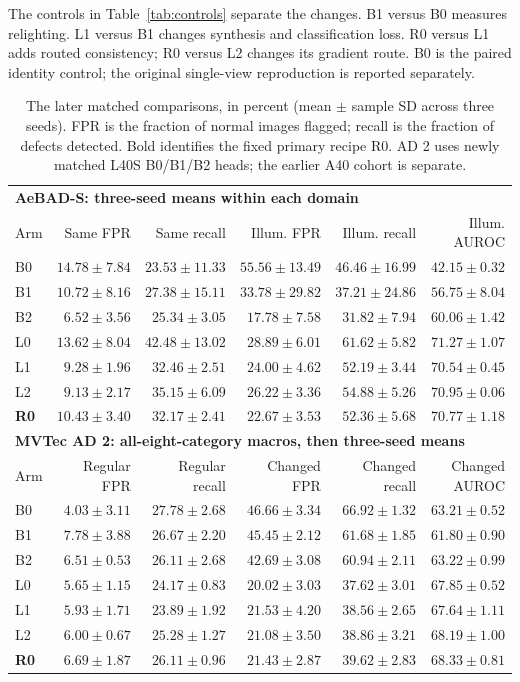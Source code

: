 \documentclass[letterpaper]{article}
\begin{document}
The controls in Table~\ref{tab:controls} separate the changes. B1 versus B0 measures
relighting. L1 versus B1 changes synthesis and classification loss. R0 versus L1 adds routed
consistency; R0 versus L2 changes its gradient route. B0 is the paired identity control; the
original single-view reproduction is reported separately.

\begin{table}[t]
\centering\small
\begin{tabular}{lrrrrr}
\toprule
\multicolumn{6}{l}{\textbf{AeBAD-S: three-seed means within each domain}}\\
Arm & Same FPR & Same recall & Illum. FPR & Illum. recall & Illum. AUROC\\
\midrule
B0 & $14.78\pm7.84$ & $23.53\pm11.33$ & $55.56\pm13.49$ & $46.46\pm16.99$ & $42.15\pm0.32$\\
B1 & $10.72\pm8.16$ & $27.38\pm15.11$ & $33.78\pm29.82$ & $37.21\pm24.86$ & $56.75\pm8.04$\\
B2 & $6.52\pm3.56$ & $25.34\pm3.05$ & $17.78\pm7.58$ & $31.82\pm7.94$ & $60.06\pm1.42$\\
L0 & $13.62\pm8.04$ & $42.48\pm13.02$ & $28.89\pm6.01$ & $61.62\pm5.82$ & $71.27\pm1.07$\\
L1 & $9.28\pm1.96$ & $32.46\pm2.51$ & $24.00\pm4.62$ & $52.19\pm3.44$ & $70.54\pm0.45$\\
L2 & $9.13\pm2.17$ & $35.15\pm6.09$ & $26.22\pm3.36$ & $54.88\pm5.26$ & $70.95\pm0.06$\\
\textbf{R0} & $10.43\pm3.40$ & $32.17\pm2.41$ & $22.67\pm3.53$ & $52.36\pm5.68$ & $70.77\pm1.18$\\
\midrule
\multicolumn{6}{l}{\textbf{MVTec AD 2: all-eight-category macros, then three-seed means}}\\
Arm & Regular FPR & Regular recall & Changed FPR & Changed recall & Changed AUROC\\
\midrule
B0 & $4.03\pm3.11$ & $27.78\pm2.68$ & $46.66\pm3.34$ & $66.92\pm1.32$ & $63.21\pm0.52$\\
B1 & $7.78\pm3.88$ & $26.67\pm2.20$ & $45.45\pm2.12$ & $61.68\pm1.85$ & $61.80\pm0.90$\\
B2 & $6.51\pm0.53$ & $26.11\pm2.68$ & $42.69\pm3.08$ & $60.94\pm2.11$ & $63.22\pm0.99$\\
L0 & $5.65\pm1.15$ & $24.17\pm0.83$ & $20.02\pm3.03$ & $37.62\pm3.01$ & $67.85\pm0.52$\\
L1 & $5.93\pm1.71$ & $23.89\pm1.92$ & $21.53\pm4.20$ & $38.56\pm2.65$ & $67.64\pm1.11$\\
L2 & $6.00\pm0.67$ & $25.28\pm1.27$ & $21.08\pm3.50$ & $38.86\pm3.21$ & $68.19\pm1.00$\\
\textbf{R0} & $6.69\pm1.87$ & $26.11\pm0.96$ & $21.43\pm2.87$ & $39.62\pm2.83$ & $68.33\pm0.81$\\
\bottomrule
\end{tabular}
\caption{The later matched comparisons, in percent (mean $\pm$ sample SD across three seeds). FPR is the fraction of normal images flagged; recall is the fraction of defects detected. Bold identifies the fixed primary recipe R0. AD 2 uses newly matched L40S B0/B1/B2 heads; the earlier A40 cohort is separate.}
\label{tab:transfer}
\end{table}
\end{document}
